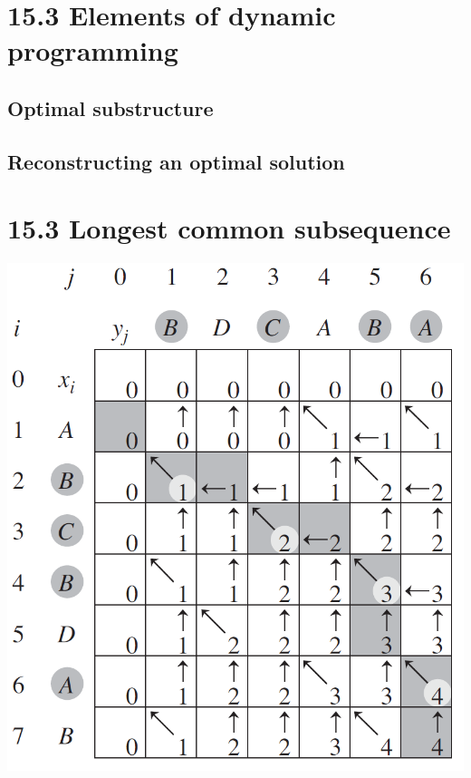 \documentclass[a4paper]{article}
\begin{document}
\section*{15.3 Elements of dynamic programming}
\subsection*{Optimal substructure}
\subsection*{Reconstructing an optimal solution}

\section*{15.3 Longest common subsequence}
\begin{center}
    \includegraphics[scale=1]{"Longest common subsequence"}
\end{center}
\end{document}
